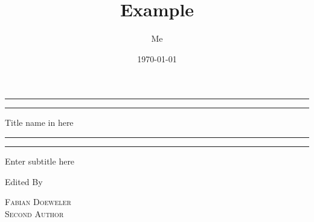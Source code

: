 \documentclass[12pt]{article}
\title{Example}
\author{Me}
\date{\today}
\begin{document}
 

\begin{titlepage} %

	\centering %
	
	\scshape %
	
	\vspace*{\baselineskip} %
	
	
	\rule{\textwidth}{1.6pt}\vspace*{-\baselineskip}\vspace*{2pt} %
	\rule{\textwidth}{0.4pt} %
	
	\vspace{0.75\baselineskip} %
	
	{\LARGE Title name in here} %
	
	\vspace{0.75\baselineskip} %
	
	\rule{\textwidth}{0.4pt}\vspace*{-\baselineskip}\vspace{3.2pt} %
	\rule{\textwidth}{1.6pt} %
	
	\vspace{2\baselineskip} %
	
	
	Enter subtitle here
	
	\vspace*{3\baselineskip} %
	
	
	Edited By
	
	\vspace{0.5\baselineskip} %
	
	{\scshape\Large Fabian Doeweler \\ Second Author \\} %
	
	\vspace{0.5\baselineskip} %
	

\end{titlepage}
\end{document}
